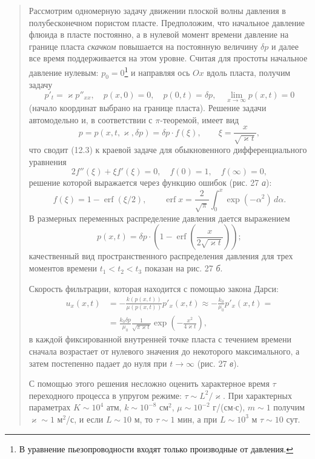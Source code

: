 \documentclass[12pt,a4paper]{article}
\begin{document}
\begin{quote}\sloppy
Рассмотрим одномерную задачу движении плоской волны давления в полубесконечном пористом пласте. Предположим, что начальное давление флюида в пласте постоянно, а в нулевой момент времени давление на границе пласта \textit{скачком} повышается на постоянную величину $\delta p$ и далее все время поддерживается на этом уровне. Считая для простоты начальное давление нулевым: $p_0=0$\footnote{В уравнение пьезопроводности входят только производные от давления.} и направляя ось $Ox$ вдоль пласта, получим задачу
\begin{equation}
p'_t=\varkappa p''_{xx},\quad p(x,0)=0,\quad p(0,t)=\delta p,\quad \lim_{x\to\infty}p(x,t)=0\tag{12.3}\label{q8:eq-12-3}
\end{equation}
(начало координат выбрано на границе пласта). Решение задачи автомодельно и, в соответствии с $\pi$-теоремой, имеет вид
\[
p=p(x,t,\varkappa,\delta p)=\delta p\cdot f(\xi),\qquad \xi=\frac{x}{\sqrt{\varkappa t}},
\]
что сводит (12.3) к краевой задаче для обыкновенного дифференциального уравнения
\[
2f''(\xi)+\xi f'(\xi)=0,\quad f(0)=1,\quad f(\infty)=0,
\]
решение которой выражается через функцию ошибок (рис. 27 \textit{а}):
\[
f(\xi)=1-\operatorname{erf}(\xi/2),\qquad \operatorname{erf}x=\frac{2}{\sqrt\pi}\int_0^x\exp(-\alpha^2)\,d\alpha.
\]
В размерных переменных распределение давления дается выражением
\[
p(x,t)=\delta p\cdot\left(1-\operatorname{erf}\left(\frac{x}{2\sqrt{\varkappa t}}\right)\right);
\]
качественный вид пространственного распределения давления для трех моментов времени $t_1<t_2<t_3$ показан на рис. 27 \textit{б}.


Скорость фильтрации, которая находится с помощью закона Дарси:
\[\begin{aligned}
u_x(x,t)&=-\frac{k(p(x,t))}{\mu(p(x,t))}p'_x(x,t)\approx-\frac{k_0}{\mu_0}p'_x(x,t)=\\
&=\frac{k_0\delta p}{\mu_0}\frac{1}{\sqrt{\pi\varkappa t}}\exp\left(-\frac{x^2}{4\varkappa t}\right),
\end{aligned}\]
в каждой фиксированной внутренней точке пласта с течением времени сначала возрастает от нулевого значения до некоторого максимального, а затем постепенно падает до нуля при $t\to\infty$ (рис. 27 \textit{в}).

С помощью этого решения несложно оценить характерное время $\tau$ переходного процесса в упругом режиме: $\tau\sim L^2/\varkappa$. При характерных параметрах $K\sim10^4$ атм, $k\sim10^{-8}$ см$^2$, $\mu\sim10^{-2}$ г/(см$\cdot$с), $m\sim1$ получим $\varkappa\sim1$ м$^2$/с, и если $L\sim10$ м, то $\tau\sim1$ мин, а при $L\sim10^3$ м $\tau\sim10$ сут.
\par\nobreak{}\par
\end{quote}
\endgroup
\end{document}
